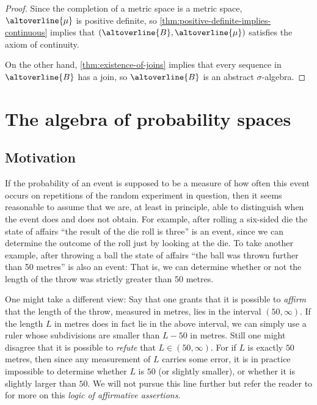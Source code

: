 \documentclass[article, a4paper, 11pt, oneside]{memoir}
\numberwithin{equation}{chapter}
\renewcommand{\P}{\mathbb{P}}
\begin{document}
\begin{proof}
    Since the completion of a metric space is a metric space, $\altoverline{\mu}$ is positive definite, so \cref{thm:positive-definite-implies-continuous} implies that $(\altoverline{B},\altoverline{\mu})$ satisfies the axiom of continuity.

    On the other hand, \cref{thm:existence-of-joins} implies that every sequence in $\altoverline{B}$ has a join, so $\altoverline{B}$ is an abstract $\sigma$-algebra.
\end{proof}



\chapter{The algebra of probability spaces}

\section{Motivation}

\newcommand{\compl}[1]{\altoverline{#1}}
\renewcommand{\P}{P}

If the probability of an event is supposed to be a measure of how often this event occurs on repetitions of the random experiment in question, then it seems reasonable to assume that we are, at least in principle, able to distinguish when the event does and does not obtain. For example, after rolling a six-sided die the state of affairs \enquote{the result of the die roll is three} is an event, since we can determine the outcome of the roll just by looking at the die. To take another example, after throwing a ball the state of affairs \enquote{the ball was thrown further than 50 metres} is also an event: That is, we can determine whether or not the length of the throw was strictly greater than 50 metres.

One might take a different view: Say that one grants that it is possible to \emph{affirm} that the length of the throw, measured in metres, lies in the interval $(50,\infty)$. If the length $L$ in metres does in fact lie in the above interval, we can simply use a ruler whose subdivisions are smaller than $L - 50$ in metres. Still one might disagree that it is possible to \emph{refute} that $L \in (50, \infty)$. For if $L$ is exactly $50$ metres, then since any measurement of $L$ carries some error, it is in practice impossible to determine whether $L$ is $50$ (or slightly smaller), or whether it is slightly larger than $50$. We will not pursue this line further but refer the reader to \textcite{vickers1989} for more on this \emph{logic of affirmative assertions}.
\end{document}
